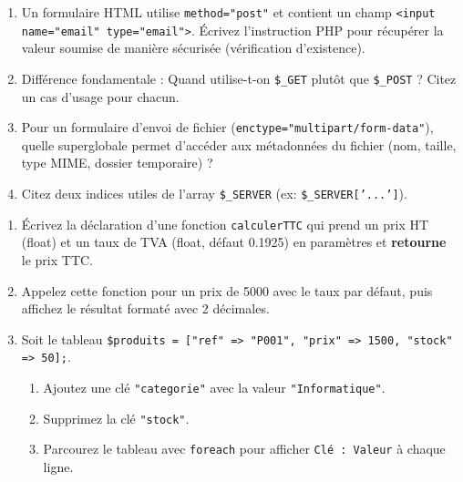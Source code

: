\documentclass[11pt]{article}
\begin{document}
\begin{exercice}
\begin{enumerate}
    \item Un formulaire HTML utilise \texttt{method="post"} et contient un champ \texttt{<input name="email" type="email">}. Écrivez l'instruction PHP pour récupérer la valeur soumise de manière sécurisée (vérification d'existence).
    \item Différence fondamentale : Quand utilise-t-on \texttt{\$\_GET} plutôt que \texttt{\$\_POST} ? Citez un cas d'usage pour chacun.
    \item Pour un formulaire d'envoi de fichier (\texttt{enctype="multipart/form-data"}), quelle superglobale permet d'accéder aux métadonnées du fichier (nom, taille, type MIME, dossier temporaire) ?
    \item Citez deux indices utiles de l'array \texttt{\$\_SERVER} (ex: \texttt{\$\_SERVER['...']}).
\end{enumerate}
\end{exercice}

\begin{exercice}
\begin{enumerate}
    \item Écrivez la déclaration d'une fonction \texttt{calculerTTC} qui prend un prix HT (float) et un taux de TVA (float, défaut 0.1925) en paramètres et \textbf{retourne} le prix TTC.
    \item Appelez cette fonction pour un prix de 5000 avec le taux par défaut, puis affichez le résultat formaté avec 2 décimales.
    \item Soit le tableau \texttt{\$produits = ["ref" => "P001", "prix" => 1500, "stock" => 50];}.
    \begin{enumerate}
        \item Ajoutez une clé \texttt{"categorie"} avec la valeur \texttt{"Informatique"}.
        \item Supprimez la clé \texttt{"stock"}.
        \item Parcourez le tableau avec \texttt{foreach} pour afficher \texttt{Clé : Valeur} à chaque ligne.
    \end{enumerate}
\end{enumerate}
\end{exercice}
\end{document}
